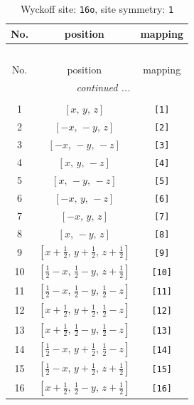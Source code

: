 \documentclass[fleqn,8pt]{jsarticle}
\begin{document}
\begin{longtable}{ccc}
\caption{Wyckoff site: {\tt 16o}, site symmetry: {\tt 1}}
 \\
 \hline \hline
No. & position & mapping \\ \hline \endfirsthead

\multicolumn{2}{l}{\tablename\ \thetable{}} \\
 \hline \hline
No. & position & mapping \\ \hline \endhead

 \hline \hline
\multicolumn{2}{r}{\footnotesize\it continued ...} \\ \endfoot

 \hline \hline
\multicolumn{2}{r}{} \\ \endlastfoot

1 & $\left[ x,\, y,\, z \right]$ & {\tt [1]} \\ \hline
2 & $\left[ - x,\, - y,\, z \right]$ & {\tt [2]} \\ \hline
3 & $\left[ - x,\, - y,\, - z \right]$ & {\tt [3]} \\ \hline
4 & $\left[ x,\, y,\, - z \right]$ & {\tt [4]} \\ \hline
5 & $\left[ x,\, - y,\, - z \right]$ & {\tt [5]} \\ \hline
6 & $\left[ - x,\, y,\, - z \right]$ & {\tt [6]} \\ \hline
7 & $\left[ - x,\, y,\, z \right]$ & {\tt [7]} \\ \hline
8 & $\left[ x,\, - y,\, z \right]$ & {\tt [8]} \\ \hline
9 & $\left[ x + \frac{1}{2},\, y + \frac{1}{2},\, z + \frac{1}{2} \right]$ & {\tt [9]} \\ \hline
10 & $\left[ \frac{1}{2} - x,\, \frac{1}{2} - y,\, z + \frac{1}{2} \right]$ & {\tt [10]} \\ \hline
11 & $\left[ \frac{1}{2} - x,\, \frac{1}{2} - y,\, \frac{1}{2} - z \right]$ & {\tt [11]} \\ \hline
12 & $\left[ x + \frac{1}{2},\, y + \frac{1}{2},\, \frac{1}{2} - z \right]$ & {\tt [12]} \\ \hline
13 & $\left[ x + \frac{1}{2},\, \frac{1}{2} - y,\, \frac{1}{2} - z \right]$ & {\tt [13]} \\ \hline
14 & $\left[ \frac{1}{2} - x,\, y + \frac{1}{2},\, \frac{1}{2} - z \right]$ & {\tt [14]} \\ \hline
15 & $\left[ \frac{1}{2} - x,\, y + \frac{1}{2},\, z + \frac{1}{2} \right]$ & {\tt [15]} \\ \hline
16 & $\left[ x + \frac{1}{2},\, \frac{1}{2} - y,\, z + \frac{1}{2} \right]$ & {\tt [16]} \\
\end{longtable}
\end{document}
